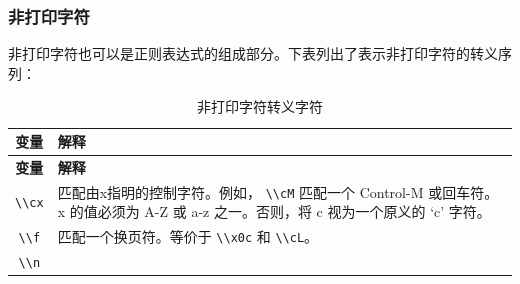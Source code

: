 \documentclass[doctor,openright,twoside]{sjtuthesis}
\newcommand{\passthrough}[1]{#1}
\theoremstyle{plain}
\theoremstyle{definition}
\theoremstyle{remark}
\theoremstyle{ocrenumbox}
\theoremstyle{plain}
\begin{document}
\subsubsection{非打印字符}

非打印字符也可以是正则表达式的组成部分。下表列出了表示非打印字符的转义序列：

\begin{longtable}[]{@{}cl@{}}
\caption{非打印字符转义字符}\tabularnewline
\toprule
\begin{minipage}[b]{0.23\columnwidth}\centering
\textbf{变量}\strut
\end{minipage} & \begin{minipage}[b]{0.72\columnwidth}\raggedright
\textbf{解释}\strut
\end{minipage}\tabularnewline
\midrule
\endfirsthead
\toprule
\begin{minipage}[b]{0.23\columnwidth}\centering
\textbf{变量}\strut
\end{minipage} & \begin{minipage}[b]{0.72\columnwidth}\raggedright
\textbf{解释}\strut
\end{minipage}\tabularnewline
\midrule
\endhead
\begin{minipage}[t]{0.23\columnwidth}\centering
\passthrough{\lstinline!\\cx!}\strut
\end{minipage} & \begin{minipage}[t]{0.72\columnwidth}\raggedright
匹配由x指明的控制字符。例如， \passthrough{\lstinline!\\cM!} 匹配一个
Control-M 或回车符。x 的值必须为 A-Z 或 a-z 之一。否则，将 c
视为一个原义的 `c' 字符。\strut
\end{minipage}\tabularnewline
\begin{minipage}[t]{0.23\columnwidth}\centering
\passthrough{\lstinline!\\f!}\strut
\end{minipage} & \begin{minipage}[t]{0.72\columnwidth}\raggedright
匹配一个换页符。等价于 \passthrough{\lstinline!\\x0c!} 和
\passthrough{\lstinline!\\cL!}。\strut
\end{minipage}\tabularnewline
\begin{minipage}[t]{0.23\columnwidth}\centering
\passthrough{\lstinline!\\n!}\strut
\end{minipage} & \begin{minipage}[t]{0.72\columnwidth}\raggedright

\end{minipage}
\end{longtable}
\end{document}
